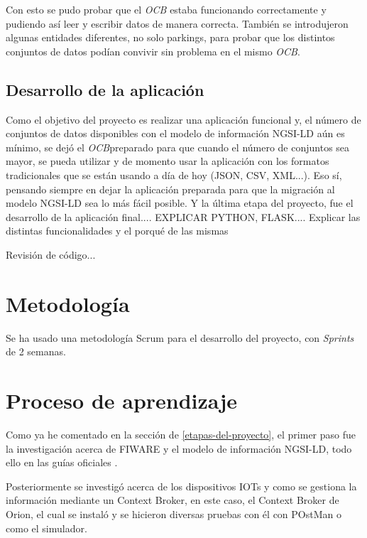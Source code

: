 Con esto se pudo probar que el \textit{OCB}\footnotemark{} estaba funcionando correctamente y pudiendo así leer y escribir datos de manera correcta. También se introdujeron algunas entidades diferentes, no solo parkings, para probar que los distintos conjuntos de datos podían convivir sin problema en el mismo \textit{OCB}\footnotemark[\value{footnote}]. 



\subsection{Desarrollo de la aplicación}
Como el objetivo del proyecto es realizar una aplicación funcional y, el número de conjuntos de datos disponibles con el modelo de información NGSI-LD aún es mínimo, se dejó el \textit{OCB}\footnotemark[\value{footnote}] preparado para que cuando el número de conjuntos sea mayor, se pueda utilizar y de momento usar la aplicación con los formatos tradicionales que se están usando a día de hoy (JSON, CSV, XML...). Eso sí, pensando siempre en dejar la aplicación preparada para que la migración al modelo NGSI-LD sea lo más fácil posible.
Y la última etapa del proyecto, fue el desarrollo de la aplicación final.... EXPLICAR PYTHON, FLASK....
Explicar las distintas funcionalidades y el porqué de las mismas

Revisión de código...


\section{Metodología}
Se ha usado una metodología Scrum para el desarrollo del proyecto, con \textit{Sprints} de 2 semanas.

\section{Proceso de aprendizaje}

Como ya he comentado en la sección de \ref{etapas-del-proyecto}, el primer paso fue la investigación acerca de FIWARE y el modelo de información NGSI-LD, todo ello en las guías oficiales \cite{fiware,fiware_ngsi_ld,etsi}. 

Posteriormente se investigó acerca de los dispositivos IOTs y como se gestiona la información mediante un Context Broker, en este caso, el Context Broker de Orion, el cual se instaló y se hicieron diversas pruebas con él con POstMan o como el simulador.

